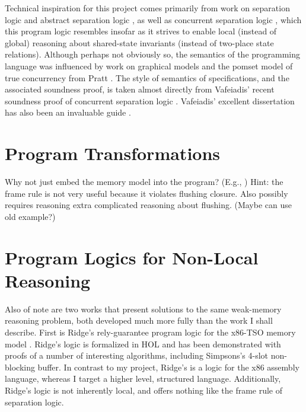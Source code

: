 \documentclass[11pt]{report}
\begin{document}
Technical inspiration for this project comes primarily from work on separation logic \cite{DBLP:conf/lics/Reynolds02,DBLP:conf/csl/OHearnRY01,DBLP:journals/bsl/OHearnP99} and abstract separation logic \cite{DBLP:conf/lics/CalcagnoOY07}, as well as concurrent separation logic  \cite{DBLP:journals/tcs/OHearn07,DBLP:journals/tcs/Brookes07}, which this program logic resembles insofar as it strives to enable local (instead of global) reasoning about shared-state invariants (instead of two-place state relations). Although perhaps not obviously so, the semantics of the programming language was influenced by work on graphical models \cite{DBLP:journals/ipl/WehrmanHO09,DBLP:conf/RelMiCS/HoareMSW09,DBLP:journals/jlp/HoareMSW11} and the pomset model of true concurrency from Pratt \cite{DBLP:conf/popl/Pratt82,DBLP:conf/concur/Pratt84}. The style of semantics of specifications, and the associated soundness proof, is taken almost directly from Vafeiadis' recent soundness proof of concurrent separation logic \cite{V11}. Vafeiadis' excellent dissertation has also been an invaluable guide \cite{VafeiadisDissertation}. 

\section{Program Transformations}

Why not just embed the memory model into the program? (E.g., \cite{DBLP:conf/tphol/Ridge07}) Hint: the frame rule is not very useful because it violates flushing closure. Also possibly requires reasoning extra complicated reasoning about flushing.  (Maybe can use old example?)


\section{Program Logics for Non-Local Reasoning}

Also of note are two works that present solutions to the same weak-memory reasoning problem, both developed much more fully than the work I shall describe. First is Ridge's rely-guarantee program logic for the x86-TSO memory model \cite{DBLP:conf/vstte/Ridge10}. Ridge's logic is formalized in HOL and has been demonstrated with proofs of a number of interesting algorithms, including Simpsons's 4-slot non-blocking buffer. In contrast to my project, Ridge's is a logic for the x86 assembly language, whereas I target a higher level, structured language. Additionally, Ridge's logic is not inherently local, and offers nothing like the frame rule of separation logic. 
\end{document}
